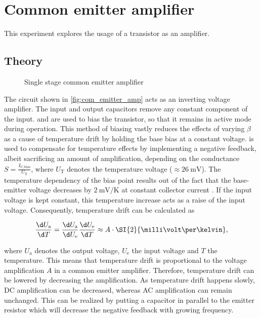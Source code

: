 \chapter{Common emitter amplifier}
This experiment explores the usage of a transistor as an amplifier.

\section{Theory}
\begin{figure}[tbp]
	\centering
	\caption[Single Stage Common Emitter Amplifier]{Single stage common emitter amplifier}
	\label{fig:com_emitter_amp}
\end{figure}
The circuit shown in \autoref{fig:com_emitter_amp} acts as an inverting voltage amplifier.
The input and output capacitors remove any constant component of the input.
 and  are used to bias the transistor, so that it remains in active mode during operation.
This method of biasing vastly reduces the effects of varying $\beta$ as a cause of temperature drift by holding the base bias at a constant voltage.
 is used to compensate for temperature effects by implementing a negative feedback, albeit sacrificing an amount of amplification, depending on the conductance $S=\frac{I_\text{C,bias}}{U_\text{T}}$, where $U_\text{T}$ denotes the temperature voltage ($\approx\SI{26}{\milli\volt}$).
The temperature dependency of the bias point results out of the fact that the base-emitter voltage  decreases by $\SI{2}{\milli\volt\per\kelvin}$ at constant collector current .
If the input voltage is kept constant, this temperature increase acts as a raise of the input voltage.
Consequently, temperature drift can be calculated as

\begin{equation}
	\frac{\d U_\text{a}}{\d T}=\frac{\d U_\text{a}}{\d U_\text{e}}\frac{\d U_\text{e}}{\d T}\approx A\cdot\SI{2}{\milli\volt\per\kelvin},
\end{equation}

where $U_\text{a}$ denotes the output voltage, $U_\text{e}$ the input voltage and $T$ the temperature.
This means that temperature drift is proportional to the voltage amplification $A$ in a common emitter amplifier.
Therefore, temperature drift can be lowered by decreasing the amplification.
As temperature drift happens slowly, DC amplification can be decreased, whereas AC amplification can remain unchanged.
This can be realized by putting a capacitor  in parallel to the emitter resistor  which will decrease the negative feedback with growing frequency.

